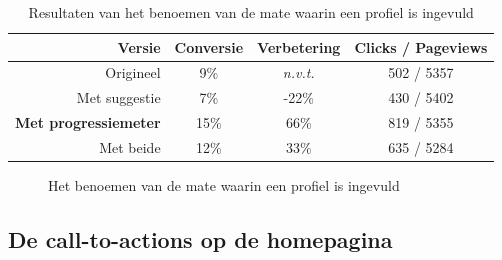 \documentclass[a4paper, 10pt, pdftex]{report}
\begin{document}
        \begin{table}[ht]
        \centering
        \begin{tabular}{r|*{3}{c}}
          \textbf{Versie}                   & Conversie  & Verbetering   & Clicks / Pageviews \\ \hline
          Origineel                         & 9\%        & \emph{n.v.t.} & 502 / 5357 \\
          Met suggestie                     & 7\%        & -22\%         & 430 / 5402\\
          \textbf{Met progressiemeter}      & 15\%       & 66\%          & 819 / 5355\\
          Met beide  & 12\%       & 33\%          & 635 / 5284\\
        \end{tabular}
        \caption{Resultaten van het benoemen van de mate waarin een profiel is ingevuld}
        \label{tab:profilecta}
        \end{table}

    \begin{figure}
      \caption{Het benoemen van de mate waarin een profiel is ingevuld}
    \end{figure}

    \subsection{De call-to-actions op de homepagina}
      \label{ctahomepagetest}
\end{document}
